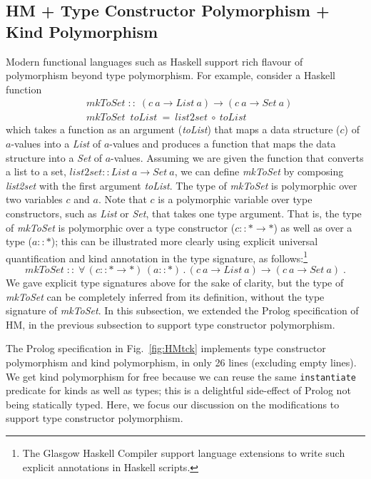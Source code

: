 \documentclass[runningheads,a4paper]{llncs}
\begin{document}
\subsection{HM + Type Constructor Polymorphism + Kind Polymorphism}
\label{ssec:HMtck}
Modern functional languages such as Haskell support rich flavour of
polymorphism beyond type polymorphism. For example, consider
a Haskell function
\begin{align*}
&\textit{mkToSet}\;::\;(c~a\to\textit{List}~a) \to (c~a\to\textit{Set}~a)\\
&\textit{mkToSet}~\;\textit{toList}~=~\textit{list2set}~\circ~\textit{toList}
\end{align*}
which takes a function as an argument (\textit{toList}) that maps
a data structure ($c$) of $a$-values into a \textit{List} of $a$-values and
produces a function that maps the data structure into a \textit{Set} of
$a$-values. Assuming we are given the function that converts a list to a set,
$\textit{list2set} :: \textit{List}~a \to \textit{Set}~a$, we can define 
\textit{mkToSet} by composing \textit{list2set} with the first argument
\textit{toList}. The type of \textit{mkToSet} is polymorphic over two
variables $c$ and $a$. Note that $c$ is a polymorphic variable over
type constructors, such as \textit{List} or \textit{Set}, that takes
one type argument. That is, the type of \textit{mkToSet} is polymorphic
over a type constructor ($c :: *\to*$) as well as over a type ($a :: *$);
this can be illustrated more clearly using explicit universal quantification
and kind annotation in the type signature, as follows:\footnote{
    The Glasgow Haskell Compiler support language extensions to
    write such explicit annotations in Haskell scripts.
    }
\[\textit{mkToSet}\;::\;
    \forall\,(c :: *\to*)\,(a :: *)\,.\,
      (c~a\to\textit{List}~a) \to (c~a\to\textit{Set}~a) \; .\]
We gave explicit type signatures above for the sake of clarity,
but the type of \textit{mkToSet} can be completely inferred from
its definition, without the type signature of \textit{mkToSet}.
In this subsection, we extended the Prolog specification of HM,
in the previous subsection to support type constructor polymorphism.

The Prolog specification in Fig.~\ref{fig:HMtck} implements
type constructor polymorphism and kind polymorphism, in only 26 lines
(excluding empty lines).
We get kind polymorphism for free because we can reuse
the same \verb|instantiate| predicate for kinds as well as types;
this is a delightful side-effect of Prolog not being statically typed.
Here, we focus our discussion on the modifications to support
type constructor polymorphism.
\end{document}
